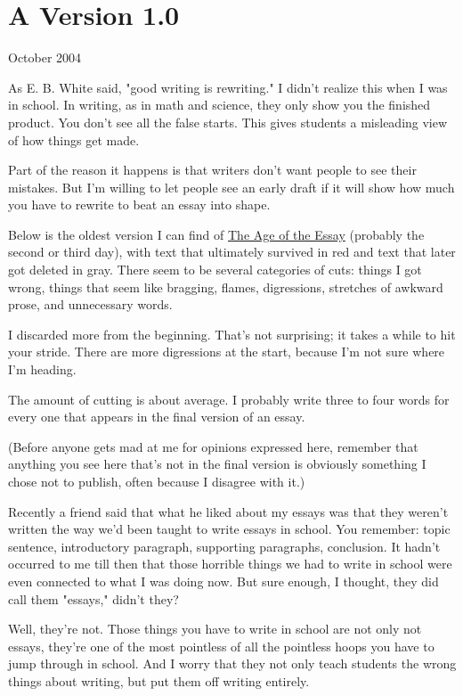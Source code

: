 \chapter{A Version 1.0}



October 2004


As E. B. White said, "good writing is rewriting."  I didn't
realize this when I was in school.  In writing, as in math and 
science, they only show you the finished product.
You don't see all the false starts.  This gives students a
misleading view of how things get made.

Part of the reason it happens is that writers don't want   
people to see their mistakes.  But I'm willing to let people
see an early draft if it will show how much you have
to rewrite to beat an essay into shape.

Below is the oldest version I can find of
\href{http://www.paulgraham.com/essay.html}{The Age of the Essay}   
(probably the second or third day), with
text that ultimately survived in 
red and text that later
got deleted in gray.
There seem to be several categories of cuts: things I got wrong,
things that seem like bragging, flames,
digressions, stretches of awkward prose, and unnecessary words.

I discarded more from the beginning.  That's
not surprising; it takes a while to hit your stride.  There
are more digressions at the start, because I'm not sure where
I'm heading.

The amount of cutting is about average.  I probably write
three to four words for every one that appears in the final
version of an essay.

(Before anyone gets mad at me for opinions expressed here, remember
that anything you see here that's not in the final version is obviously
something I chose not to publish, often because I disagree
with it.)




Recently a friend said that what he liked about
my essays was that they weren't written the way
we'd been taught to write essays in school.  You
remember: topic sentence, introductory paragraph,
supporting paragraphs, conclusion.  It hadn't
occurred to me till then that those horrible things
we had to write in school were even connected to
what I was doing now.  But sure enough, I thought,
they did call them "essays," didn't they?

Well, they're not.  Those things you have to write
in school are not only not essays, they're one of the
most pointless of all the pointless hoops you have
to jump through in school.  And I worry that they
not only teach students the wrong things about writing,
but put them off writing entirely.

